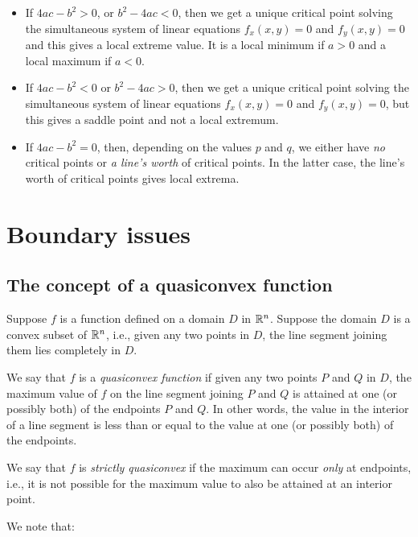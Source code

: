 \documentclass[10pt]{amsart}
\begin{document}
\begin{itemize}
\item If $4ac - b^2 > 0$, or $b^2 - 4ac < 0$, then we get a unique
  critical point solving the simultaneous system of linear equations
  $f_x(x,y) = 0$ and $f_y(x,y) = 0$ and this gives a local extreme
  value. It is a local minimum if $a > 0$ and a local maximum if $a < 0$.
\item If $4ac - b^2 < 0$ or $b^2 - 4ac > 0$, then we get a unique
  critical point solving the simultaneous system of linear equations
  $f_x(x,y) = 0$ and $f_y(x,y) = 0$, but this gives a saddle point and
  not a local extremum.
\item If $4ac - b^2 = 0$, then, depending on the values $p$ and $q$,
  we either have {\em no} critical points or {\em a line's worth} of
  critical points. In the latter case, the line's worth of critical
  points gives local extrema.
\end{itemize}

\section{Boundary issues}

\subsection{The concept of a quasiconvex function}

Suppose $f$ is a function defined on a domain $D$ in $\mathbb{R}^n$. Suppose
the domain $D$ is a convex subset of $\mathbb{R}^n$, i.e., given any two
points in $D$, the line segment joining them lies completely in $D$.

We say that $f$ is a {\em quasiconvex function} if given any two
points $P$ and $Q$ in $D$, the maximum value of $f$ on the line
segment joining $P$ and $Q$ is attained at one (or possibly both) of
the endpoints $P$ and $Q$. In other words, the value in the interior
of a line segment is less than or equal to the value at one (or
possibly both) of the endpoints.

We say that $f$ is {\em strictly quasiconvex} if the maximum can occur
{\em only} at endpoints, i.e., it is not possible for the maximum
value to also be attained at an interior point.

We note that:
\end{document}

